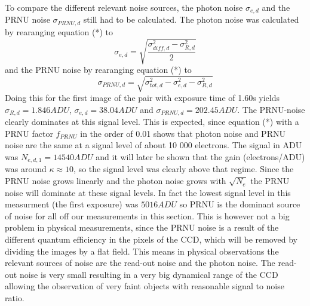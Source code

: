\documentclass[12pt]{article}
\begin{document}
To compare the different relevant noise sources, the photon noise $\sigma_{e,d}$ and the PRNU noise $\sigma_{PRNU,d}$ still had to be calculated. The photon noise was calculated by rearanging equation (*) to 
\begin{equation}
 \sigma_{e,d}=\sqrt{\frac{\sigma_{diff,d}^2-\sigma_{R,d}^2}{2}}
\end{equation}
and the PRNU noise by rearanging equation (*) to
\begin{equation}
 \sigma_{PRNU,d}=\sqrt{\sigma_{tot,d}^2-\sigma_{e,d}^2-\sigma_{R,d}^2}
\end{equation}
Doing this for the first image of the pair with exposure time of 1.60s yields $\sigma_{R,d}=1.846ADU$, $\sigma_{e,d}=38.04ADU$ and $\sigma_{PRNU,d}=202.45ADU$. The PRNU-noise clearly dominates at this signal level. This is expected, since equation (*) with a PRNU factor $f_{PRNU}$ in the order of 0.01 shows that photon noise and PRNU noise are the same at a signal level of about 10 000 electrons.  The signal in ADU was $N_{e,d,1}=14540ADU$ and it will later be shown that the gain (electrons/ADU) was around $\kappa\approx10$, so the signal level was clearly above that regime. Since the PRNU noise grows linearly and the photon noise grows with $\sqrt{N_e}$ the PRNU noise will dominate at these signal levels. In fact the lowest signal level in this measurment (the first exposure) was $5016ADU$ so PRNU is the dominant source of noise for all off our measurements in this section. This is however not a big problem in physical measurements, since the PRNU noise is a result of the different quantum efficiency in the pixels of the CCD, which will be removed by dividing the images by a flat field. This means in physical observations the relevant sources of noise are the read-out noise and the photon noise. The read-out noise is very small resulting in a very big dynamical range of the CCD allowing the observation of very faint objects with reasonable signal to noise ratio. 
\end{document}
